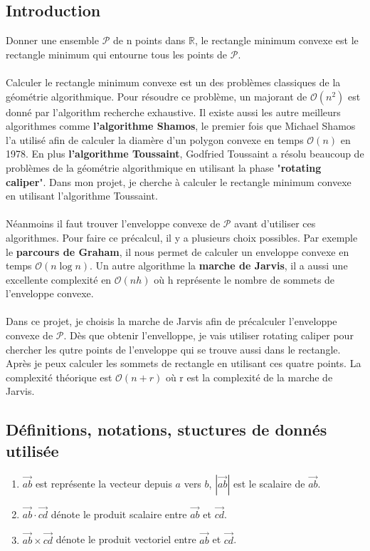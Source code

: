 \documentclass[14px]{article}
\begin{document}
\subsection{Introduction}
Donner une ensemble $\mathcal{P}$ de n points dans $\mathbb{R}$, le rectangle minimum convexe est le rectangle minimum qui entourne tous les points de $\mathcal{P}$.\\\\
Calculer le rectangle minimum convexe est un des problèmes classiques de la géométrie algorithmique. Pour résoudre ce problème, un majorant de $\mathcal{O}(n^2)$ est donné par l'algorithm recherche exhaustive. Il existe aussi les autre meilleurs algorithmes comme \textbf{l'algorithme Shamos}, le premier fois que Michael Shamos l'a utilisé afin de calculer la diamère d’un polygon convexe en temps $\mathcal{O}(n)$ en 1978. En plus \textbf{l'algorithme Toussaint}, Godfried Toussaint a résolu beaucoup de problèmes de la géométrie algorithmique en utilisant la phase "\textbf{rotating caliper}". Dans mon projet, je cherche à calculer le rectangle minimum convexe en utilisant l'algorithme Toussaint.\\\\
Néanmoins il faut trouver l'enveloppe convexe de $\mathcal{P}$ avant d'utiliser ces algorithmes. Pour faire ce précalcul, il y a plusieurs choix possibles. Par exemple le \textbf{parcours de Graham}, il nous permet de calculer un enveloppe convexe en temps $\mathcal{O}(n\log n)$. Un autre algorithme la \textbf{marche de Jarvis}, il a aussi une excellente complexité en $\mathcal{O}(nh)$ où h représente le nombre de sommets de l'enveloppe convexe. \\\\
Dans ce projet, je choisis la marche de Jarvis afin de précalculer l'enveloppe convexe de $\mathcal{P}$. Dès que obtenir l'envelloppe, je vais utiliser rotating caliper pour chercher les qutre points de l'enveloppe qui se trouve aussi dans le rectangle. Après je peux calculer les sommets de rectangle en utilisant ces quatre points. La complexité théorique est $\mathcal{O}(n + r)$ où r est la complexité de la marche de Jarvis.
\clearpage

\subsection{Définitions, notations, stuctures de donnés utilisée}

\begin{enumerate}
	\item $\overrightarrow{ab}$ est représente la vecteur depuis $a$ vers $b$, $|\overrightarrow{ab}|$ est le scalaire de $\overrightarrow{ab}$.
	\item $\overrightarrow{ab}\cdot\overrightarrow{cd}$ dénote le produit scalaire entre $\vec{ab}$ et $\vec{cd}$.
	\item $\overrightarrow{ab}\times\overrightarrow{cd}$ dénote le produit vectoriel entre $\overrightarrow{ab}$ et $\overrightarrow{cd}$.
\end{enumerate}
\end{document}
